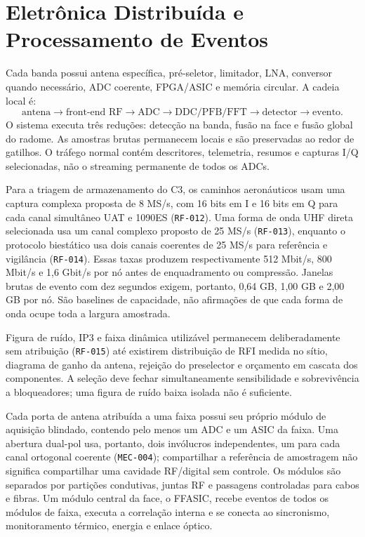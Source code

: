 \chapter{Eletrônica Distribuída e Processamento de Eventos}

Cada banda possui antena específica, pré-seletor, limitador, LNA, conversor quando necessário, ADC coerente, FPGA/ASIC e memória circular. A cadeia local é:
\[
\text{antena}\rightarrow\text{front-end RF}\rightarrow\text{ADC}\rightarrow\text{DDC/PFB/FFT}\rightarrow\text{detector}\rightarrow\text{evento}.
\]
O sistema executa três reduções: detecção na banda, fusão na face e fusão global do radome. As amostras brutas permanecem locais e são preservadas ao redor de gatilhos. O tráfego normal contém descritores, telemetria, resumos e capturas I/Q selecionadas, não o streaming permanente de todos os ADCs.

Para a triagem de armazenamento do C3, os caminhos aeronáuticos usam uma captura complexa proposta de 8 MS/s, com 16 bits em I e 16 bits em Q para cada canal simultâneo UAT e 1090ES (\texttt{RF-012}). Uma forma de onda UHF direta selecionada usa um canal complexo proposto de 25 MS/s (\texttt{RF-013}), enquanto o protocolo biestático usa dois canais coerentes de 25 MS/s para referência e vigilância (\texttt{RF-014}). Essas taxas produzem respectivamente 512 Mbit/s, 800 Mbit/s e 1,6 Gbit/s por nó antes de enquadramento ou compressão. Janelas brutas de evento com dez segundos exigem, portanto, 0,64 GB, 1,00 GB e 2,00 GB por nó. São baselines de capacidade, não afirmações de que cada forma de onda ocupe toda a largura amostrada.

Figura de ruído, IP3 e faixa dinâmica utilizável permanecem deliberadamente sem atribuição (\texttt{RF-015}) até existirem distribuição de RFI medida no sítio, diagrama de ganho da antena, rejeição do preselector e orçamento em cascata dos componentes. A seleção deve fechar simultaneamente sensibilidade e sobrevivência a bloqueadores; uma figura de ruído baixa isolada não é suficiente.

Cada porta de antena atribuída a uma faixa possui seu próprio módulo de aquisição blindado, contendo pelo menos um ADC e um ASIC da faixa. Uma abertura dual-pol usa, portanto, dois invólucros independentes, um para cada canal ortogonal coerente (\texttt{MEC-004}); compartilhar a referência de amostragem não significa compartilhar uma cavidade RF/digital sem controle. Os módulos são separados por partições condutivas, juntas RF e passagens controladas para cabos e fibras. Um módulo central da face, o FFASIC, recebe eventos de todos os módulos de faixa, executa a correlação interna e se conecta ao sincronismo, monitoramento térmico, energia e enlace óptico.

